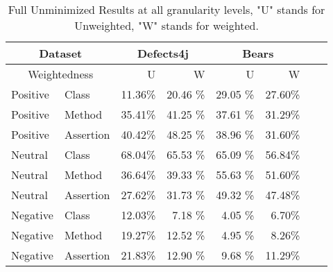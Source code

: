 \documentclass[sigconf, timestamp-false, anonymous=true]{acmart}
\begin{document}
\begin{table}
{\begin{center}
\begin{tabular}{| l | l | r | r | r | r | r | r |}
\hline
\multicolumn{2}{|c|}{Dataset} &\multicolumn{2}{|c|}{Defects4j} & \multicolumn{2}{|c|}{Bears} \\
\hline
\multicolumn{2}{|c|}{Weightedness} & U & W & U & W  \\
\hline
Positive & Class & 11.36\% & 20.46 \% & 29.05 \% & 27.60\%  \\
Positive & Method & 35.41\% & 41.25 \% & 37.61 \% & 31.29\%  \\
Positive & Assertion & 40.42\% & 48.25 \% & 38.96 \% & 31.60\%  \\ 
\hline
Neutral & Class & 68.04\% & 65.53 \% & 65.09 \% & 56.84\% \\
Neutral & Method & 36.64\% & 39.33 \% & 55.63 \% & 51.60\%  \\
Neutral & Assertion & 27.62\% & 31.73 \% & 49.32 \% &  47.48\%  \\ 
\hline
Negative & Class & 12.03\% & 7.18 \% & 4.05 \% & 6.70\%  \\
Negative & Method & 19.27\% & 12.52 \% & 4.95 \% & 8.26\%  \\
Negative & Assertion & 21.83\% & 12.90 \% & 9.68 \% &  11.29\%  \\ 
\hline
\end{tabular}
\end{center}}
\caption{Full Unminimized Results at all granularity levels, "U" stands for Unweighted, "W" stands for weighted. }
\end{table}
\end{document}
